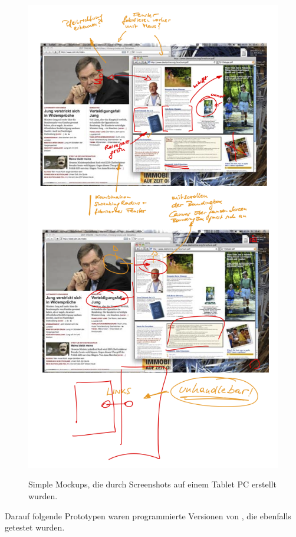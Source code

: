 \begin{figure}
	        {\includegraphics[width=1\linewidth]{gfx/scribblerMockups}}
		\caption[Mockups in Scribbler]{Simple Mockups, die durch Screenshots auf einem Tablet PC erstellt wurden.}\label{fig:scribblerMockups}
\end{figure}

\medskip Darauf folgende Prototypen waren programmierte Versionen von \scribbler, die ebenfalls getestet wurden.

